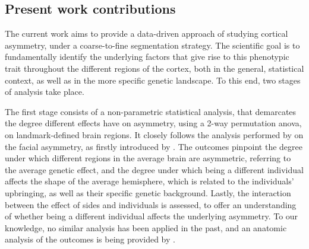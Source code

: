 \subsection{Present work contributions}
The current work aims to provide a data-driven approach of studying cortical asymmetry, under a coarse-to-fine segmentation strategy. The scientific goal is to fundamentally identify the underlying factors that give rise to this phenotypic trait throughout the different regions of the cortex, both in the general, statistical context, as well as in the more specific genetic landscape. To this end, two stages of analysis take place. 

The first stage consists of a non-parametric statistical analysis, that demarcates the degree different effects have on asymmetry, using a 2-way permutation \ac{anova}, on landmark-defined brain regions. It closely follows the analysis performed by \citet{Claes2012} on the facial asymmetry, as firstly introduced by \citet{Klingenberg1998}. The outcomes pinpoint the degree under which different regions in the average brain are asymmetric, referring to the average genetic effect, and the degree under which being a different individual affects the shape of the average hemisphere, which is related to the individuals' upbringing, as well as their specific genetic background. Lastly, the interaction between the effect of sides and individuals is assessed, to offer an understanding of whether being a different individual affects the underlying asymmetry. To our knowledge, no similar analysis has been applied in the past, and an anatomic analysis of the outcomes is being provided by \citet{Vanbiervliet2022}.

